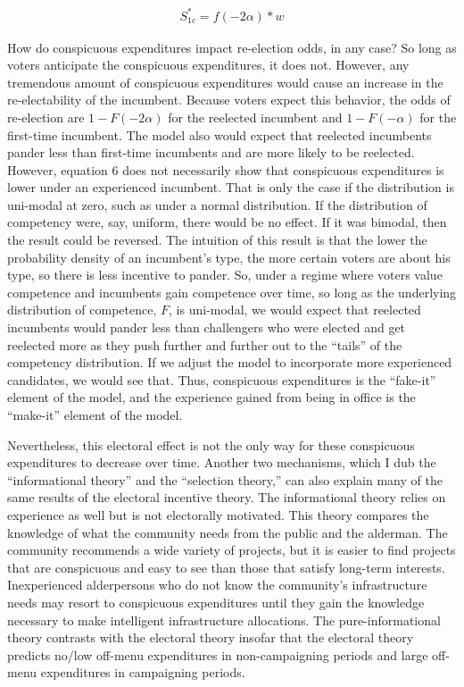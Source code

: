 \begin{align}
    S_{1c}^*=f(-2 \alpha)*w
\end{align}

How do conspicuous expenditures impact re-election odds, in any case? So long as voters anticipate the conspicuous expenditures, it does not. 
However, any tremendous amount of conspicuous expenditures would cause an increase in the re-electability of the incumbent. 
Because voters expect this behavior, the odds of re-election are $1-F(-2 \alpha)$ for the reelected incumbent and $1-F(-\alpha)$ for the first-time incumbent. 
The model also would expect that reelected incumbents pander less than first-time incumbents and are more likely to be reelected. 
However, equation 6 does not necessarily show that conspicuous expenditures is lower under an experienced incumbent. 
That is only the case if the distribution is uni-modal at zero, such as under a normal distribution. 
If the distribution of competency were, say, uniform, there would be no effect. 
If it was bimodal, then the result could be reversed. 
The intuition of this result is that the lower the probability density of an incumbent's type, the more certain voters are about his type, so there is less incentive to pander. 
So, under a regime where voters value competence and incumbents gain competence over time, so long as the underlying distribution of competence, $F$, is uni-modal, we would expect that reelected incumbents would pander less than challengers who were elected and get reelected more as they push further and further out to the ``tails'' of the competency distribution. 
If we adjust the model to incorporate more experienced candidates, we would see that. 
 Thus, conspicuous expenditures is the ``fake-it'' element of the model, and the experience gained from being in office is the ``make-it'' element of the model. 

Nevertheless, this electoral effect is not the only way for these conspicuous expenditures to decrease over time. 
Another two mechanisms, which I dub the ``informational theory'' and the ``selection theory,'' can also explain many of the same results of the electoral incentive theory. 
The informational theory relies on experience as well but is not electorally motivated. 
This theory compares the knowledge of what the community needs from the public and the alderman. 
The community recommends a wide variety of projects, but it is easier to find projects that are conspicuous and easy to see than those that satisfy long-term interests. 
Inexperienced alderpersons who do not know the community's infrastructure needs may resort to conspicuous expenditures until they gain the knowledge necessary to make intelligent infrastructure allocations. 
The pure-informational theory contrasts with the electoral theory insofar that the electoral theory predicts no/low off-menu expenditures in non-campaigning periods and large off-menu expenditures in campaigning periods. 

